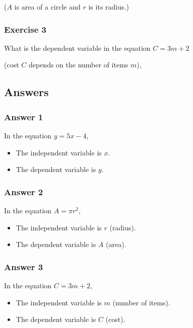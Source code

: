 \documentclass[12pt]{article}
\begin{document}
($A$ is area of a circle and $r$ is its radius.)

\subsubsection*{Exercise 3}

What is the dependent variable in the equation \( C = 3m + 2 \)

(cost \( C \) depends on the number of items \( m \)),

\subsection*{Answers}

\subsubsection*{Answer 1}

In the equation \( y = 5x - 4 \),

\begin{itemize}
    \item The independent variable is \( x \).
    \item The dependent variable is \( y \).
\end{itemize}

\subsubsection*{Answer 2}

In the equation \( A = \pi r^2 \),

\begin{itemize}
    \item The independent variable is \( r \) (radius).
    \item The dependent variable is \( A \) (area).
\end{itemize}

\subsubsection*{Answer 3}

In the equation \( C = 3m + 2 \),

\begin{itemize}
    \item The independent variable is \( m \) (number of items).
    \item The dependent variable is \( C \) (cost).
\end{itemize}
\end{document}

